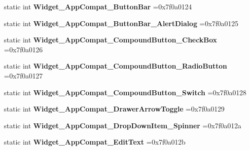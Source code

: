 \begin{DoxyCompactItemize}
static int {\bfseries Widget\+\_\+\+App\+Compat\+\_\+\+Button\+Bar} =0x7f0a0124
\item 
\mbox{\label{classandroid_1_1support_1_1graphics_1_1drawable_1_1R_1_1style_a3a1f4c804b24b1fa5cb0dfc252f598dd}} 
static int {\bfseries Widget\+\_\+\+App\+Compat\+\_\+\+Button\+Bar\+\_\+\+Alert\+Dialog} =0x7f0a0125
\item 
\mbox{\label{classandroid_1_1support_1_1graphics_1_1drawable_1_1R_1_1style_a7b3e848d54f434fe5893ece440959015}} 
static int {\bfseries Widget\+\_\+\+App\+Compat\+\_\+\+Compound\+Button\+\_\+\+Check\+Box} =0x7f0a0126
\item 
\mbox{\label{classandroid_1_1support_1_1graphics_1_1drawable_1_1R_1_1style_a4bcb544bd9a7c67dc15a095bf92cd245}} 
static int {\bfseries Widget\+\_\+\+App\+Compat\+\_\+\+Compound\+Button\+\_\+\+Radio\+Button} =0x7f0a0127
\item 
\mbox{\label{classandroid_1_1support_1_1graphics_1_1drawable_1_1R_1_1style_ac5a978adcd50b40654ec8d4c0dc9d639}} 
static int {\bfseries Widget\+\_\+\+App\+Compat\+\_\+\+Compound\+Button\+\_\+\+Switch} =0x7f0a0128
\item 
\mbox{\label{classandroid_1_1support_1_1graphics_1_1drawable_1_1R_1_1style_ae23f21158f751d278e4d841ac7f5445c}} 
static int {\bfseries Widget\+\_\+\+App\+Compat\+\_\+\+Drawer\+Arrow\+Toggle} =0x7f0a0129
\item 
\mbox{\label{classandroid_1_1support_1_1graphics_1_1drawable_1_1R_1_1style_a64fd1235c5b74c266e9c98884aec4193}} 
static int {\bfseries Widget\+\_\+\+App\+Compat\+\_\+\+Drop\+Down\+Item\+\_\+\+Spinner} =0x7f0a012a
\item 
\mbox{\label{classandroid_1_1support_1_1graphics_1_1drawable_1_1R_1_1style_ae76a878b1f1520841f3a8ff2f5895443}} 
static int {\bfseries Widget\+\_\+\+App\+Compat\+\_\+\+Edit\+Text} =0x7f0a012b

\end{DoxyCompactItemize}
